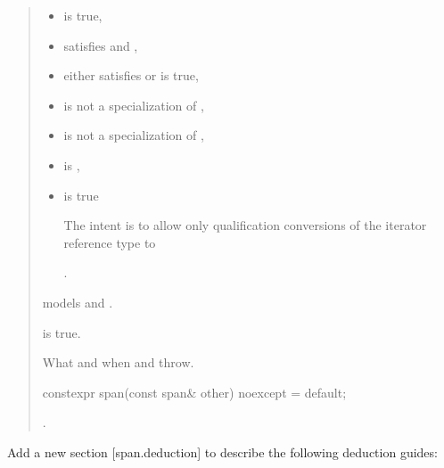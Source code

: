 \documentclass{wg21}
\begin{document}
\begin{quote}
\begin{addedblock}
\begin{itemdescr}
    \pnum
    \constraints
    \begin{itemize}
       \item {} is true,
       \item {} satisfies  and ,
       \item either  satisfies  or  is true,
       \item {} is not a specialization of ,
       \item {} is not a specialization of ,
       \item {} is ,
       \item {} is true
       \begin{note}The intent is to allow only qualification conversions of the iterator reference type to  \end{note}.
    \end{itemize}

	\expects {} models  and .

    \pnum
    \ensures
     is true.

    \pnum
    \throws
    What and when  and  throw.

\end{itemdescr}
\end{addedblock}

\begin{itemdecl}
constexpr span(const span& other) noexcept = default;
\end{itemdecl}
\begin{itemdescr}
    \pnum
    \ensures
    .
\end{itemdescr}

\end{quote}


Add a new section [span.deduction] to describe the following deduction guides:
\end{document}
